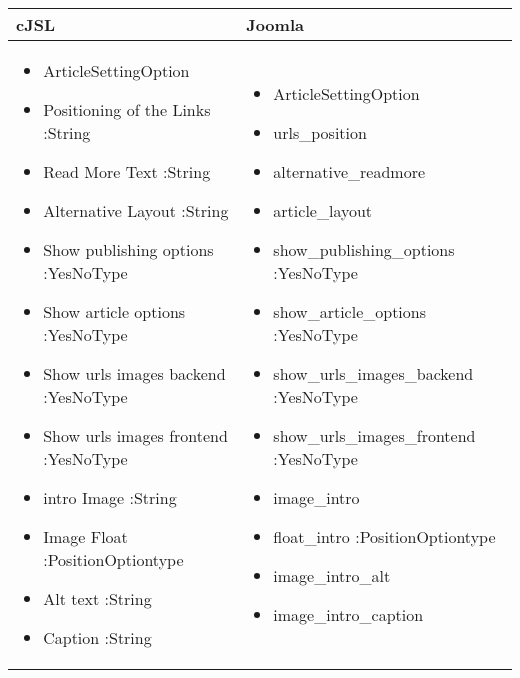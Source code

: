 \begin{minipage}{0.78\textwidth}
\begin{tabular}{|p{} | p{}|}
\hline
\textbf{cJSL} & \textbf{Joomla} \\ 
\hline
\begin{itemize}
\item ArticleSettingOption
\item Positioning of the Links :String
\item Read More Text :String
\item Alternative Layout :String
\item Show publishing options :YesNoType
\item Show article options :YesNoType
\item Show urls images backend :YesNoType
\item Show urls images frontend :YesNoType
\item intro Image :String
\item Image Float :PositionOptiontype
\item Alt text :String
\item Caption :String
\end{itemize}
 & 
\begin{itemize}
\item ArticleSettingOption 
\item urls\_position 
\item alternative\_readmore 
\item article\_layout
\item show\_publishing\_options :YesNoType
\item show\_article\_options :YesNoType
\item show\_urls\_images\_backend :YesNoType	 
\item show\_urls\_images\_frontend :YesNoType
\item image\_intro 
\item float\_intro :PositionOptiontype
\item image\_intro\_alt 
\item image\_intro\_caption 
\end{itemize}
\\
\hline
\end{tabular}
\end{minipage}

